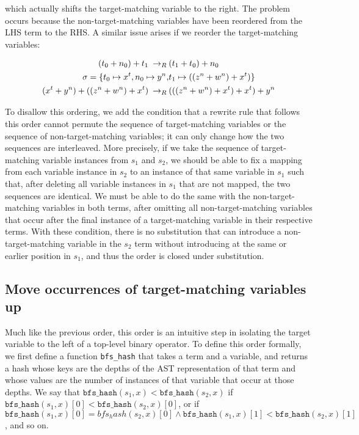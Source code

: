 which actually shifts the target-matching variable to the right. The problem occurs because the non-target-matching variables have been reordered from the LHS term to the RHS. A similar issue arises if we reorder the target-matching variables:

\begin{align*}
(t_0 + n_0) + t_1 \:\rightarrow_{R}\: & (t_1 + t_0) + n_0 \\
\sigma = \{ t_0 \mapsto x^t, n_0 \mapsto y^n, &t_1 \mapsto ((z^n + w^n) + x^t)\} \\
(x^t + y^n) + ((z^n + w^n) + x^t) \:\rightarrow_{R}\: & (((z^n + w^n) + x^t) + x^t) + y^n
\end{align*}

To disallow this ordering, we add the condition that a rewrite rule that follows this order cannot permute the sequence of target-matching variables or the sequence of non-target-matching variables; it can only change how the two sequences are interleaved. More precisely, if we take the sequence of target-matching variable instances from $s_1$ and $s_2$, we should be able to fix a mapping from each variable instance in $s_2$ to an instance of that same variable in $s_1$ such that, after deleting all variable instances in $s_1$ that are not mapped, the two sequences are identical. We must be able to do the same with the non-target-matching variables in both terms, after omitting all non-target-matching variables that occur after the final instance of a target-matching variable in their respective terms. With these condition, there is no substitution that can introduce a non-target-matching variable in the $s_2$ term without introducing at the same or earlier position in $s_1$, and thus the order is closed under substitution.

\subsection{Move occurrences of target-matching variables up}

Much like the previous order, this order is an intuitive step in isolating the target variable to the left of a top-level binary operator. To define this order formally, we first define a function \texttt{bfs_hash} that takes a term and a variable, and returns a hash whose keys are the depths of the AST representation of that term and whose values are the number of instances of that variable that occur at those depths. We say that $\texttt{bfs_hash}(s_1, x) < \texttt{bfs_hash}(s_2, x)$ if $\texttt{bfs_hash}(s_1, x)[0] < \texttt{bfs_hash}(s_2, x)[0]$, or if $\texttt{bfs_hash}(s_1, x)[0] = bfs_hash(s_2, x)[0] \wedge \texttt{bfs_hash}(s_1, x)[1] < \texttt{bfs_hash}(s_2, x)[1]$, and so on.

